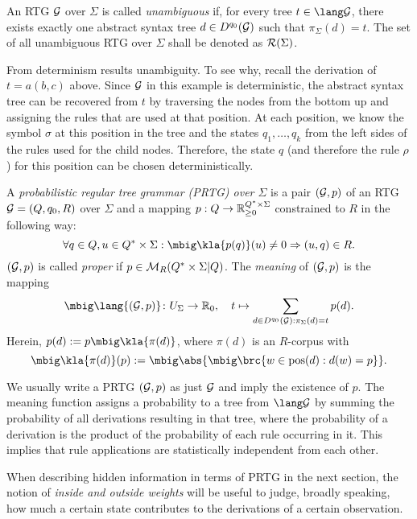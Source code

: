 \begin{definition}
 An RTG $\mathcal G$ over $\Sigma$ is called \emph{unambiguous} if, for every tree
 $t\in\lang\ug$, there exists exactly one abstract syntax tree $d\in
 D^{q_0}(\mathcal G)$ such that $\pi_\Sigma(d) = t$.
 The set of all unambiguous RTG over $\Sigma$ shall be denoted as $\mathcal R(\Sigma)$.
\end{definition}

\label{lemma:02-deterministic-is-unambiguous}
From determinism results unambiguity. To see why, recall the derivation of $t =
a(b,c)$ above. Since $\mathcal G$ in this example is deterministic, the abstract
syntax tree can be recovered from $t$ by traversing the nodes from the bottom
up and assigning the rules that are used at that position. At each position, we
know the symbol $\sigma$ at this position in the tree and the states
$q_1,\ldots,q_k$ from the left sides of the rules used for the child nodes.
Therefore, the state $q$ (and therefore the rule $\rho$) for this position can
be chosen deterministically.

\begin{definition}
 A \emph{probabilistic regular tree grammar (PRTG) over $\Sigma$} is a pair
 $(\mathcal G,p)$ of an RTG $\mathcal G=(Q,q_0,R)$ over $\Sigma$ and a mapping
 $p:Q\to\mathbb R_{\geq0}^{Q^*\times\Sigma}$ constrained to $R$ in the
 following way:
 \[
  \forall q\in Q, u\in Q^*\times\Sigma: \mbig\kla{p(q)}(u) \neq 0 \Rightarrow (u,q) \in R.
 \]
 $(\mathcal G,p)$ is called \emph{proper} if $p\in\mathcal M_R(Q^*\times\Sigma|Q)$. The
 \emph{meaning} of $(\mathcal G,p)$ is the mapping
 \[
  \mbig\lang{(\ug,p)}\colon U_\Sigma \to \zr_0, \quad
  t \mapsto \sum_{d\in D^{q_0}(\ug): \pi_\Sigma(d)=t} p(d).
 \]
 Herein, $p(d) := p\mbig\kla{\pi(d)}$, where $\pi(d)$ is an $R$-corpus with
 \[
  \mbig\kla{\pi(d)}(p) := \mbig\abs{\mbig\brc{w\in\pos(d): d(w)=p}}.
 \]
\end{definition}

We usually write a PRTG $(\mathcal G,p)$ as just $\mathcal G$ and imply the existence of $p$.
The meaning function assigns a probability to a tree from $\lang\ug$ by summing
the probability of all derivations resulting in that tree, where the
probability of a derivation is the product of the probability of each rule
occurring in it. This implies that rule applications are statistically
independent from each other.

When describing hidden information in terms of PRTG in the next section, the
notion of \emph{inside and outside weights} will be useful to judge, broadly
speaking, how much a certain state contributes to the derivations of a certain
observation.

